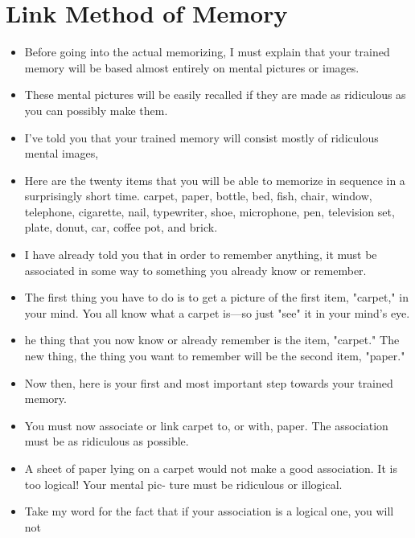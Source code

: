     \section*{Link Method of Memory}
        \begin{itemize}
            \item Before going into the actual memorizing, I must explain
            that your trained memory will be based almost entirely on
            mental pictures or images.
            \item These mental pictures will be
            easily recalled if they are made as ridiculous as you can
            possibly make them.
            \item I've told you that your trained memory will consist mostly of ridiculous mental images,
            \item Here are the twenty items that you
            will be able to memorize in sequence in a surprisingly short
            time.
                \subitem carpet, paper, bottle, bed, fish, chair, window, telephone,
            cigarette, nail, typewriter, shoe, microphone, pen, television set,
            plate, donut, car, coffee pot, and brick.
            \item I have already told you that in order
            to remember anything, it must be associated in some way to
            something you already know or remember.
            \item The first thing you have to do is to get a picture of the
            first item, "carpet," in your mind. You all know what a
            carpet is—so just "see" it in your mind's eye.
            \item he thing that you
            now know or already remember is the item, "carpet." The
            new thing, the thing you want to remember will be the
            second item, "paper."
            \item Now then, here is your first and most important step
            towards your trained memory.
            \item You must now associate or
            link carpet to, or with, paper. The association must be as
            ridiculous as possible.
            \item A sheet of paper lying on a carpet would not
            make a good association. It is too logical! Your mental pic-
            ture must be ridiculous or illogical.
            \item Take my word for the
            fact that if your association is a logical one, you will not

\end{itemize}
